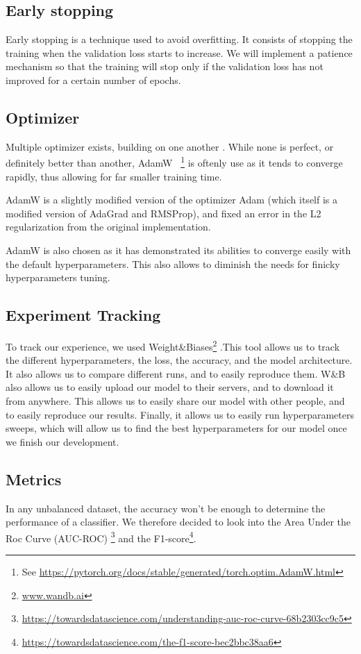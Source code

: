 \documentclass[11pt]{article}
\begin{document}
    \subsection{Early stopping}

        Early stopping is a technique used to avoid overfitting. It consists of stopping the training when the validation loss starts to increase. We will
        implement a patience mechanism so that the training will stop only if the validation loss has not improved for a certain number of epochs.
    \subsection{Optimizer}

        Multiple optimizer exists, building on one another . While none is perfect, or definitely better than another, AdamW~\cite{adamw} \footnote{See \url{https://pytorch.org/docs/stable/generated/torch.optim.AdamW.html}} is oftenly use as it tends
        to converge rapidly, thus allowing for far smaller training time.

        AdamW is a slightly modified version of the optimizer Adam (which itself is a modified version of AdaGrad and RMSProp), and fixed an error in the L2 regularization from the original implementation.

        AdamW is also chosen as it has demonstrated its abilities to converge easily with the default hyperparameters. This also allows to diminish the needs for finicky hyperparameters tuning.


    \subsection{Experiment Tracking}

        To track our experience, we used Weight\&Biases\footnote{\url{www.wandb.ai}} .This tool allows us to track the different hyperparameters,
        the loss, the accuracy, and the model architecture. It also allows us to compare different runs, and to easily reproduce them.
        W\&B also allows us to easily upload our model to their servers, and to download it from anywhere. This
        allows us to easily share our model with other people, and to easily reproduce our results. Finally, it allows us
        to easily run hyperparameters sweeps, which will allow us to find the best hyperparameters for our model once we
        finish our development.

    \subsection{Metrics}
        In any unbalanced dataset, the accuracy won't be enough to determine the performance of a classifier.
        We therefore decided to look into the Area Under the Roc Curve (AUC-ROC) \footnote{\url{https://towardsdatascience.com/understanding-auc-roc-curve-68b2303cc9c5}}
        and the F1-score\footnote{\url{https://towardsdatascience.com/the-f1-score-bec2bbc38aa6}}.
\end{document}
